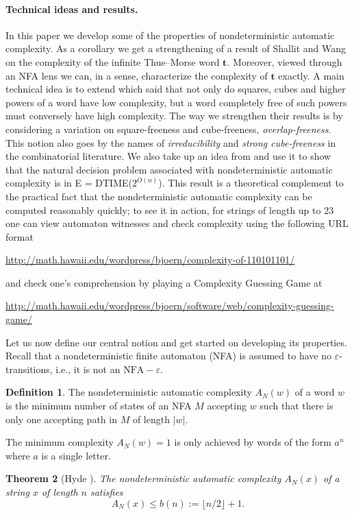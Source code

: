 \documentclass[12pt]{article}
\newcommand{\abs}[1]{\lvert#1\rvert}
\newcommand{\myUrl}[1]{
	\begin{center}
		{\small\url{#1}} 
	\end{center}
}
\theoremstyle{plain}
\newtheorem{thm}{Theorem}
\theoremstyle{definition}
\newtheorem{df}[thm]{Definition}
\theoremstyle{remark}
\begin{document}
		\paragraph{Technical ideas and results.} In this paper we develop some of the properties of nondeterministic automatic complexity.
		As a corollary we get a strengthening of a result of Shallit and Wang \cite{MR1897300}
		on the complexity of the infinite Thue--Morse word $\mathbf t$.
		Moreover, viewed through an NFA lens we can, in a sense, characterize the complexity of $\mathbf t$ exactly.
		A main technical idea is to extend \cite[Theorem 9]{MR1897300} which said that
		not only do squares, cubes and higher powers of a word have low complexity,
		but a word completely free of such powers must conversely have high complexity.
		The way we strengthen their results is by considering a variation
		on square-freeness and cube-freeness, \emph{overlap-freeness}.
		This notion also goes by the names of \emph{irreducibility} and \emph{strong cube-freeness} in the combinatorial literature.
		We also take up an idea from \cite[Theorem 8]{MR1897300} and use it to show that
		the natural decision problem associated with nondeterministic automatic complexity is in E = DTIME($2^{O(n)}$).
		This result is a theoretical complement to the practical fact that
		the nondeterministic automatic complexity can be computed reasonably quickly;
		to see it in action, for strings of length up to 23
		one can view automaton witnesses and check complexity using the following URL format
			\myUrl{http://math.hawaii.edu/wordpress/bjoern/complexity-of-110101101/}
		and check one's comprehension by playing a Complexity Guessing Game at
			\myUrl{http://math.hawaii.edu/wordpress/bjoern/software/web/complexity-guessing-game/}
		Let us now define our central notion and get started on developing its properties.
		Recall that a nondeterministic finite automaton (NFA) is assumed to have no $\varepsilon$-transitions, i.e.,
		it is not an $\mathrm{NFA}-\varepsilon$.
		\begin{df}\label{precise}
			The nondeterministic automatic complexity $A_N(w)$ of a word $w$ is the minimum number of states of an NFA $M$ accepting $w$
			such that there is only one accepting path in $M$ of length $\abs{w}$.
		\end{df}
		The minimum complexity $A_N(w)=1$ is only achieved by words of the form $a^n$ where $a$ is a single letter.
		\begin{thm}[Hyde \cite{Hyde}]\label{Hyde}
			The nondeterministic automatic complexity $A_N(x)$ of a string $x$ of length $n$ satisfies
			\[
				A_N(x) \le b(n):={\lfloor} n/2 {\rfloor} + 1\mathrm{.}
			\]
		\end{thm}
\end{document}
